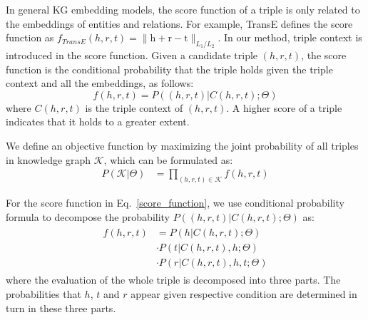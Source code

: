 In general KG embedding models, the score function of a triple is only related to the embeddings of entities and relations. For example, TransE defines the score function as $f_{TransE}(h,r,t)=\|\bm{\mathrm{h}} + \bm{\mathrm{r}} -\bm{\mathrm{t}}\|_{L_1/L_2}$. In our method, triple context is introduced in the score function. Given a candidate triple $(h,r,t)$, the score function is the conditional probability that the triple holds given the triple context and all the embeddings, as follows:
\begin{equation}\label{score_function}
  f(h,r,t) = P((h,r,t)|C(h,r,t);\Theta)
\end{equation}
where $C(h,r,t)$ is the triple context of $(h,r,t)$. A higher score of a triple indicates that it holds to a greater extent.

We define an objective function by maximizing the joint probability of all triples in knowledge graph $\mathcal{K}$, which can be formulated as:
\begin{align} \label{joint_prob}
  P(\mathcal{K}|\Theta) &= \prod_{(h,r,t)\in \mathcal{K}} f(h,r,t)
\end{align}

For the score function in Eq.~\eqref{score_function}, we use conditional probability formula to decompose the probability $P((h,r,t)|C(h,r,t);\Theta)$ as:
\begin{align} \label{decomposition}
  \begin{split}
    f(h,r,t) &= P(h|C(h,r,t);\Theta) \\
    & \cdot P(t|C(h,r,t),h;\Theta) \\
    & \cdot P(r|C(h,r,t),h,t;\Theta)
  \end{split}
\end{align}
where the evaluation of the whole triple is decomposed into three parts. The probabilities that $h$, $t$ and $r$ appear given respective condition are determined in turn in these three parts.

